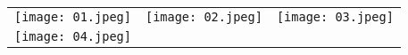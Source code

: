 \documentclass[a3paper,10pt]{article}
\newlength{\hauteur}
\begin{document}
\begin{tabular}{ccc}
	\texttt{[image: 01.jpeg]} &
	\texttt{[image: 02.jpeg]} &
	\texttt{[image: 03.jpeg]}  \\
	\texttt{[image: 04.jpeg]} &
\end{tabular}
\end{document}
